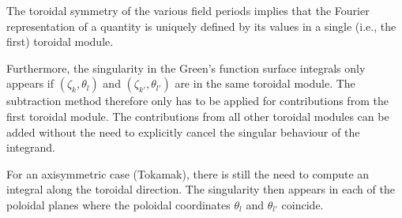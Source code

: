 The toroidal symmetry of the various field periods
implies that the Fourier representation of a quantity
is uniquely defined by its values in a single (i.e., the first) toroidal module.

Furthermore, the singularity in the Green's function surface integrals
only appears if $(\zeta_k, \theta_l)$ and $(\zeta_{k'}, \theta_{l'})$ are in the same toroidal module.
The subtraction method therefore only has to be applied for contributions
from the first toroidal module.
The contributions from all other toroidal modules
can be added without the need to explicitly cancel the singular behaviour of the integrand.

For an axisymmetric case (Tokamak),
there is still the need to compute an integral along the toroidal direction.
The singularity then appears in each of the poloidal planes
where the poloidal coordinates $\theta_l$ and $\theta_{l'}$ coincide.

